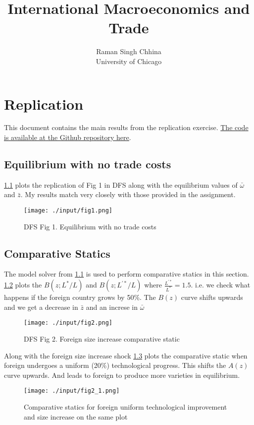 \documentclass{report}
\title{International Macroeconomics and Trade }
\author{
Raman Singh Chhina \\ {University of Chicago}
}
\date{}
\numberwithin{equation}{section}
\numberwithin{figure}{section}
\numberwithin{table}{section}
\begin{document}
\maketitle

\renewcommand{\thechapter}{\Alph{chapter}}
\setcounter{tocdepth}{1}
\tableofcontents
\etocsettocstyle{}{} %

\chapter{\cite{dornbusch1977comparative} Replication}

This document contains the main results from the replication exercise. \underline{ The code is available at the Github repository \href{https://github.com/econ-raman/code_share/tree/main/PS1_DFS}{here}}. 

\section{Equilibrium with no trade costs} \label{solver1}

\ref{fig1} plots the replication of Fig 1 in DFS along with the equilibrium values of $\bar \omega$ and $\bar z$. My results match very closely with those provided in the assignment.

\begin{figure}[H]
  \centering
  \texttt{[image: ./input/fig1.png]}
  \caption{DFS Fig 1. Equilibrium with no trade costs}
  \label{fig1}
\end{figure}

\section{Comparative Statics}

The model solver from \ref{solver1} is used to perform comparative statics in this section. \ref{fig2} plots the $B(z;L^*/L)$ and $B(z;L^{'*}/L)$ where $\frac{L^{'*}}{L^*} = 1.5$. i.e. we check what happens if the foreign country grows by 50\%. The $B(z)$ curve shifts upwards and we get a decrease in $\bar z$ and an increse in $\bar \omega $
\begin{figure}[H]
  \centering
  \texttt{[image: ./input/fig2.png]}
  \caption{DFS Fig 2. Foreign size increase comparative static}
  \label{fig2}
\end{figure}

Along with the foreign size increase shock \ref{fig2_1} plots the comparative static when foreign undergoes a uniform (20\%) technological progress. This shifts the $A(z)$ curve upwards. And leads to foreign to produce more varieties in equilibrium.
\begin{figure}[H]
  \centering
  \texttt{[image: ./input/fig2\_1.png]}
  \caption{Comparative statics for foreign uniform technological improvement and size increase on the same plot}
  \label{fig2_1}
\end{figure}
\end{document}
